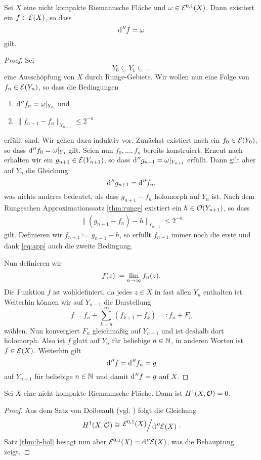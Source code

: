 \begin{thm}
  \label{thm:h-hol}
  Sei $X$ eine nicht kompakte Riemannsche Fläche und $\omega \in
  \mathcal{E}^{0,1}(X)$. Dann existiert ein $f \in \mathcal{E}(X)$, so dass
  \[
  \d[''f] = \omega
  \]
  gilt.
\end{thm}

\begin{proof}
  Sei
  \[
  Y_0 \subseteq Y_1 \subseteq \dots
  \]
  eine Ausschöpfung von $X$ durch Runge-Gebiete. Wir wollen nun eine
  Folge von $f_n \in \mathcal{E}(Y_n)$, so dass die Bedingungen
  \begin{enumerate}
  \item $\d[''f_n] = \omega|_{Y_n}$ und
  \item $\|f_{n+1} - f_n \|_{Y_{n-1}} \leq 2^{-n}$
  \end{enumerate}
  erfüllt sind. Wir gehen dazu induktiv vor. Zunächst existiert nach
  \cite[Kor. 14.16]{For} ein $f_0 \in \mathcal{E}(Y_0)$, so dass $\d[''f_0]
  = \omega|_{Y_0}$ gilt. Seien nun $f_0, \dots, f_n$ bereits
  konstruiert. Erneut nach \cite[Kor. 14.16]{For} erhalten wir ein
  $g_{n+1} \in \mathcal{E}(Y_{n+1})$, so dass $\d[''g_{n+1}] =
  \omega|_{Y_{n+1}}$ erfüllt. Dann gilt aber auf $Y_n$ die Gleichung
  \[
  \d['' g_{n+1}] = \d['' f_n],
  \]
  was nichts anderes bedeutet, als dass $g_{n+1} - f_n$ holomorph auf
  $Y_n$ ist. Nach dem Rungeschen Approximationssatz \ref{thm:runge}
  existiert ein $h \in \mathcal{O}(Y_{n+1})$, so dass
  \begin{align}
  \|(g_{n+1} - f_n) - h\|_{Y_{n-1}} \leq 2^{-n} \label{eq:app}
  \end{align}
  gilt. Definieren wir $f_{n+1} := g_{n+1} - h$, so erfüllt $f_{n+1}$
  immer noch die erste und dank \eqref{eq:app} auch die zweite
  Bedingung.

  Nun definieren wir
  \[
  f(z) := \lim_{n \rightarrow \infty} f_n(z).
  \]
  Die Funktion $f$ ist wohldefiniert, da jedes $z \in X$ in fast allen
  $Y_n$ enthalten ist. Weiterhin können wir auf $Y_{n-1}$ die Darstellung
  \[
  f = f_n + \sum_{k=n}^\infty (f_{k+1} - f_k) =: f_n + F_n
  \]
  wählen. Nun konvergiert $F_n$ gleichmäßig auf $Y_{n-1}$ und ist deshalb
  dort holomorph. Also ist $f$ glatt auf $Y_n$ für beliebige $n \in
  \mathbb{N}$, in anderen Worten ist $f \in \mathcal{E}(X)$. Weiterhin gilt
  \[
  \d[''f] = \d['' f_n] = g
  \]
  auf $Y_{n-1}$ für beliebige $n \in \mathbb{N}$ und damit $\d[''f] = g$ auf $X$.
\end{proof}

\begin{cor}
  \label{cor:h-hol}
  Sei $X$ eine nicht kompakte Riemannsche Fläche. Dann ist $H^1(X,
  \mathcal{O}) = 0$.
\end{cor}

\begin{proof}
  Aus dem Satz von Dolbeault (vgl. \cite[Satz 15.14]{For}) folgt die
  Gleichung
  \[
  H^1(X, \hol) \cong \quot{\diff^{0,1}(X)}{\d['' \diff(X)]}.
  \]
  Satz \ref{thm:h-hol} besagt nun aber $\diff^{0,1}(X) =
  \d[''\diff(X)]$, was die Behauptung zeigt.
\end{proof}

